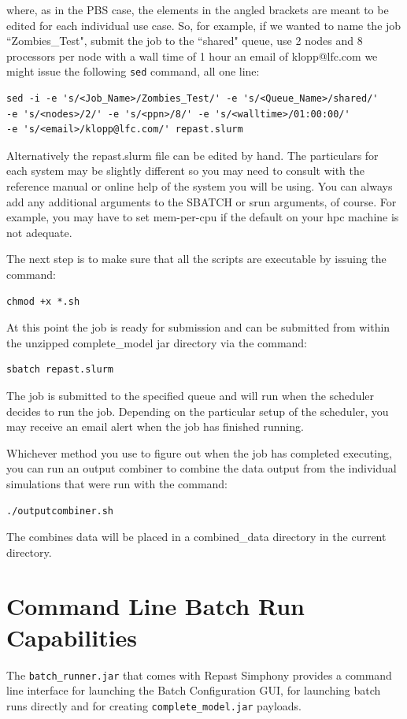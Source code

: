 \documentclass[11pt]{amsart}
\begin{document}
\noindent where, as in the PBS case, the elements in the angled brackets are meant to be edited for each individual use case. So, for example, if we wanted to name the job ``Zombies\_Test", submit the job to the ``shared" queue,  use 2 nodes and 8 processors per node with a wall time of 1 hour an email of klopp@lfc.com we might issue the following \texttt{sed} command, all one line:
\begin{verbatim}
sed -i -e 's/<Job_Name>/Zombies_Test/' -e 's/<Queue_Name>/shared/'
-e 's/<nodes>/2/' -e 's/<ppn>/8/' -e 's/<walltime>/01:00:00/' 
-e 's/<email>/klopp@lfc.com/' repast.slurm
\end{verbatim}
Alternatively the repast.slurm file can be edited by hand. The particulars for each system may be slightly different so you may need to consult with the reference manual or online help of the system you will be using.  You can always add any additional arguments to the SBATCH or srun arguments, of course. For example, you may have to set mem-per-cpu if the default on your hpc machine is not adequate.

The next step is to make sure that all the scripts are executable by issuing the command:
\begin{verbatim}
chmod +x *.sh
\end{verbatim}
At this point the job is ready for submission and can be submitted from within the unzipped complete\_model jar directory via the command:
\begin{verbatim}
sbatch repast.slurm
\end{verbatim}

The job is submitted to the specified queue and will run when the scheduler decides to run the job. Depending on the particular setup of the scheduler, you may receive an email alert when the job has finished running. 

Whichever method you use to figure out when the job has completed executing, you can run an output combiner to combine the data output from the individual simulations that were run with the command:
\begin{verbatim}
./outputcombiner.sh
\end{verbatim}
The combines data will be placed in a combined\_data directory in the current directory.

\section{Command Line Batch Run Capabilities}
\label{sec:cli_launch}
The {\tt batch\_runner.jar} that comes with Repast Simphony provides a command line interface for launching the Batch Configuration GUI, for launching batch runs directly and for creating {\tt complete\_model.jar} payloads.
\end{document}
